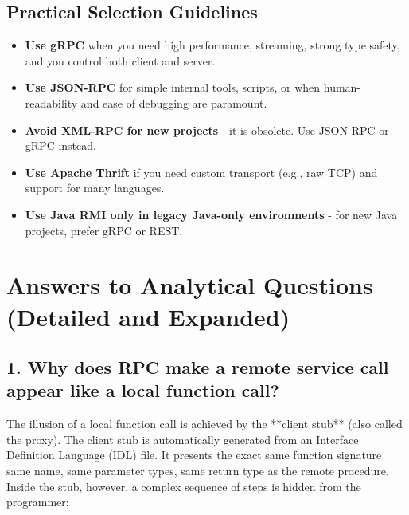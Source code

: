 \documentclass[a4paper]{article}
\begin{document}
\subsection{Practical Selection Guidelines}
\begin{itemize}
    \item \textbf{Use gRPC} when you need high performance, streaming, strong type safety, and you control both client and server.
    \item \textbf{Use JSON-RPC} for simple internal tools, scripts, or when human-readability and ease of debugging are paramount.
    \item \textbf{Avoid XML-RPC for new projects} - it is obsolete. Use JSON-RPC or gRPC instead.
    \item \textbf{Use Apache Thrift} if you need custom transport (e.g., raw TCP) and support for many languages.
    \item \textbf{Use Java RMI only in legacy Java-only environments} - for new Java projects, prefer gRPC or REST.
\end{itemize}


























\section{Answers to Analytical Questions (Detailed and Expanded)}

\subsection{1. Why does RPC make a remote service call appear like a local function call?}

The illusion of a local function call is achieved by the **client stub** (also called the proxy). The client stub is automatically generated from an Interface Definition Language (IDL) file. It presents the exact same function signature  same name, same parameter types, same return type  as the remote procedure. Inside the stub, however, a complex sequence of steps is hidden from the programmer:
\end{document}
